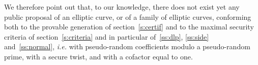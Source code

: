 \documentclass[twocolumn,letterpaper]{article}
\begin{document}
We therefore point out that, to our knowledge,
there does not exist yet any public proposal of an elliptic curve,
or of a family of elliptic curves, conforming both
to the provable generation of section~\ref{s:certif}
and to the maximal security criteria of section~\ref{s:criteria}
and in particular of~\ref{ss:dlp}, \ref{ss:side} and~\ref{ss:normal},
\emph{i.e.} with pseudo-random coefficients
modulo a pseudo-random prime,
with a secure twist,
and with a cofactor equal to one.



\end{document}
